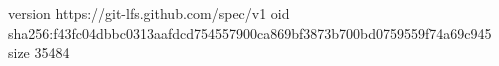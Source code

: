 version https://git-lfs.github.com/spec/v1
oid sha256:f43fc04dbbc0313aafdcd754557900ca869bf3873b700bd0759559f74a69c945
size 35484
